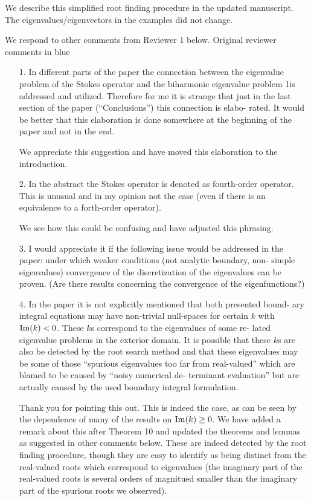 \documentclass{article}
\begin{document}
We describe this simplified root finding procedure in the updated
manuscript. The eigenvalues/eigenvectors in the examples
did not change.

We respond to other comments from Reviewer 1 below. Original
reviewer comments in {\color{blue} blue}

\begin{itemize}
\item[1.] {\color{blue} In different parts of the paper the connection between the eigenvalue
problem of the Stokes operator and the biharmonic eigenvalue problem
1is addressed and utilized. Therefore for me it is strange that just in
the last section of the paper (“Conclusions”) this connection is elabo-
rated. It would be better that this elaboration is done somewhere at
the beginning of the paper and not in the end.}

We appreciate this suggestion and have moved this elaboration to
the introduction. 

\item[2.] {\color{blue}
  In the abstract the Stokes operator is denoted as fourth-order operator.
This is unusual and in my opinion not the case (even if there is an
equivalence to a forth-order operator).}

We see how this could be confusing and have adjusted this phrasing.

\item[3.] {\color{blue} I would appreciate it if the following issue would be addressed in the
paper: under which weaker conditions (not analytic boundary, non-
simple eigenvalues) convergence of the discretization of the eigenvalues
can be proven. (Are there results concerning the convergence of the
eigenfunctions?)}


\item[4.] {\color{blue} In the paper it is not explicitly mentioned that both presented bound-
ary integral equations may have non-trivial null-spaces for certain $k$
with ${\rm Im}(k) < 0$. These $k$s correspond to the eigenvalues of some re-
lated eigenvalue problems in the exterior domain. It is possible that
these $k$s are also be detected by the root search method and that these
eigenvalues may be some of those “spurious eigenvalues too far from
real-valued” which are blamed to be caused by “noisy numerical de-
terminant evaluation” but are actually caused by the used boundary
integral formulation.}

Thank you for pointing this out. This is indeed the case, as can be seen
by the dependence of many of the results on ${\rm Im}(k) \geq 0$. We have
added a remark about this after Theorem 10 and updated the theorems and lemmas
as suggested in other comments below. These are indeed detected by the
root finding procedure, though they are easy to identify as
being distinct from the real-valued roots which correspond to
eigenvalues (the imaginary part of the real-valued roots is several
orders of magnitued smaller than the imaginary part of the
spurious roots we observed).


\end{itemize}
\end{document}
